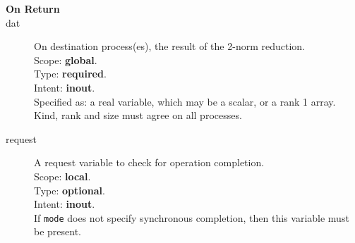 \begin{description}
\item[\bf On Return]
\item[dat] On destination process(es), the result of the 2-norm reduction.\\
Scope: {\bf global}.\\
Type: {\bf required}.\\
Intent: {\bf inout}.\\
Specified as: a real variable, which may be a
scalar, or a rank 1 array. \\
Kind, rank and size must agree on all processes.
\item[request] A request variable to check for operation completion.\\
Scope: {\bf local}.\\
Type: {\bf optional}.\\
Intent: {\bf inout}.\\
If \verb|mode| does not specify synchronous completion, then this
variable must be present.
\end{description}


